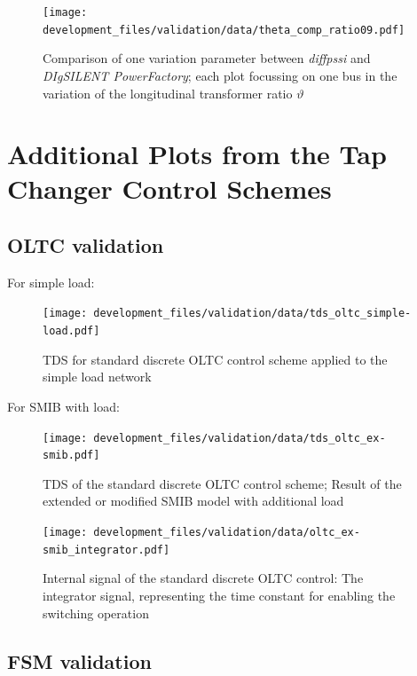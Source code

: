 \begin{figure}[H]
    \centering
    \texttt{[image: development\_files/validation/data/theta\_comp\_ratio09.pdf]}
    \caption{Comparison of one variation parameter between \textit{diffpssi} and \textit{DIgSILENT PowerFactory}; each plot focussing on one bus in the variation of the longitudinal transformer ratio $\vartheta$}
    \label{fig:valid-ratio-09}
\end{figure}

\section{Additional Plots from the Tap Changer Control Schemes}
\label{app:add-validation-tap-changer}

\subsection{OLTC validation}

For simple load:
\begin{figure}[H]
    \centering
    \texttt{[image: development\_files/validation/data/tds\_oltc\_simple-load.pdf]}
    \caption{\acf{TDS} for standard discrete \acs{OLTC} control scheme applied to the simple load network}
    \label{fig:valid-ratio-09}
\end{figure}

For SMIB with load:
\begin{figure}[H]
    \centering
    \texttt{[image: development\_files/validation/data/tds\_oltc\_ex-smib.pdf]}
    \caption[Time Domain Result of the OLTC control scheme applied on the extended \acs{SMIB} network]{\acf{TDS} of the standard discrete \acs{OLTC} control scheme; Result of the extended or modified \acs{SMIB} model with additional load}
    \label{fig:tds-oltc-ex-smib}
\end{figure}

\begin{figure}[H]
    \centering
    \texttt{[image: development\_files/validation/data/oltc\_ex-smib\_integrator.pdf]}
    \caption{Internal signal of the standard discrete \acs{OLTC} control: The integrator signal, representing the time constant for enabling the switching operation}
    \label{fig:int-signal-oltc-ext-smib-integrator}
\end{figure}

\subsection{FSM validation}

